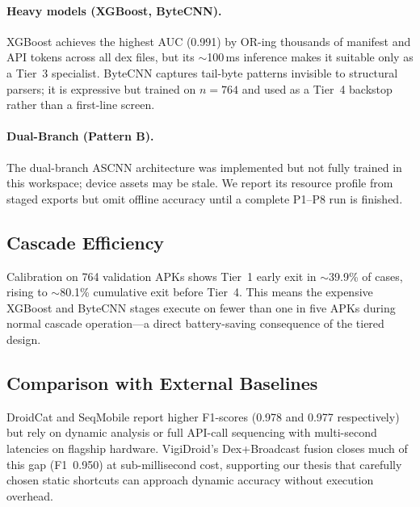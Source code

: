 \paragraph{Heavy models (XGBoost, ByteCNN).}
XGBoost achieves the highest AUC (0.991) by OR-ing thousands of manifest and API tokens across all dex files, but its $\sim$100\,ms inference makes it suitable only as a Tier~3 specialist. ByteCNN captures tail-byte patterns invisible to structural parsers; it is expressive but trained on $n{=}764$ and used as a Tier~4 backstop rather than a first-line screen.

\paragraph{Dual-Branch (Pattern B).}
The dual-branch ASCNN architecture was implemented but not fully trained in this workspace; device assets may be stale. We report its resource profile from staged exports but omit offline accuracy until a complete P1--P8 run is finished.

\subsection{Cascade Efficiency}
Calibration on 764 validation APKs shows Tier~1 early exit in $\sim$39.9\% of cases, rising to $\sim$80.1\% cumulative exit before Tier~4. This means the expensive XGBoost and ByteCNN stages execute on fewer than one in five APKs during normal cascade operation---a direct battery-saving consequence of the tiered design.

\subsection{Comparison with External Baselines}
DroidCat and SeqMobile report higher F1-scores (0.978 and 0.977 respectively) but rely on dynamic analysis or full API-call sequencing with multi-second latencies on flagship hardware. VigiDroid's Dex+Broadcast fusion closes much of this gap (F1~0.950) at sub-millisecond cost, supporting our thesis that carefully chosen static shortcuts can approach dynamic accuracy without execution overhead.

\endinput
